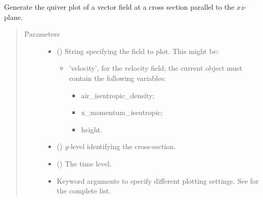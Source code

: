 \documentclass[letterpaper,10pt,english]{sphinxmanual}
\begin{document}
\begin{fulllineitems}
\begin{fulllineitems}
\begin{quote}
\begin{description}
\begin{itemize}
\end{itemize}

\end{description}\end{quote}

\end{fulllineitems}


\begin{fulllineitems}
\label{\detokenize{api:storages.state_isentropic.StateIsentropic.quiver_xz}}
Generate the quiver plot of a vector field at a cross section parallel to the \(xz\)-plane.
\begin{quote}\begin{description}
\item[{Parameters}] \leavevmode\begin{itemize}
\item {} 
 () \textendash{} 
String specifying the field to plot. This might be:
\begin{itemize}
\item {} 
’velocity’, for the velocity field; the current object must contain the following variables:
\begin{itemize}
\item {} 
air\_isentropic\_density;

\item {} 
x\_momentum\_isentropic;

\item {} 
height.

\end{itemize}

\end{itemize}


\item {} 
 () \textendash{} \(y\)-level identifying the cross-section.

\item {} 
 () \textendash{} The time level.

\item {} 
 \textendash{} Keyword arguments to specify different plotting settings.
See {\hyperref[\detokenize{api:tasmania.utils.utils_plot.quiver_xz}]{}} for the complete list.


\end{itemize}
\end{description}
\end{quote}
\end{fulllineitems}
\end{fulllineitems}
\end{document}
